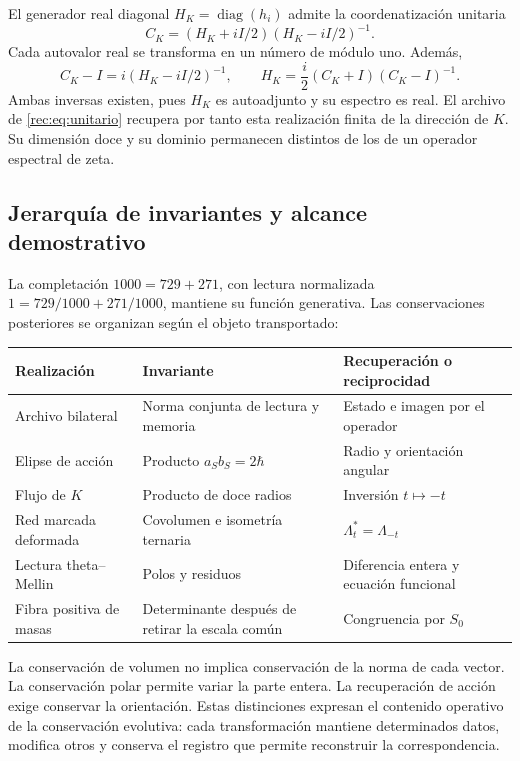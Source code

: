 El generador real diagonal \(H_K=\operatorname{diag}(h_i)\) admite la coordenatización unitaria
\[
 C_K=(H_K+iI/2)(H_K-iI/2)^{-1}.
\]
Cada autovalor real se transforma en un número de módulo uno. Además,
\[
 C_K-I=i(H_K-iI/2)^{-1},\qquad
 H_K=\frac i2(C_K+I)(C_K-I)^{-1}.
\]
Ambas inversas existen, pues \(H_K\) es autoadjunto y su espectro es real. El archivo de \eqref{rec:eq:unitario} recupera por tanto esta realización finita de la dirección de \(K\). Su dimensión doce y su dominio permanecen distintos de los de un operador espectral de zeta.

\subsection{Jerarquía de invariantes y alcance demostrativo}

La completación \(1000=729+271\), con lectura normalizada \(1=729/1000+271/1000\), mantiene su función generativa. Las conservaciones posteriores se organizan según el objeto transportado:
\begin{center}
\small
\begin{tabularx}{\linewidth}{@{}p{.27\linewidth}Xp{.25\linewidth}@{}}
\toprule
Realización & Invariante & Recuperación o reciprocidad\\
\midrule
Archivo bilateral & Norma conjunta de lectura y memoria & Estado e imagen por el operador\\
Elipse de acción & Producto \(a_Sb_S=2\hbar\) & Radio y orientación angular\\
Flujo de \(K\) & Producto de doce radios & Inversión \(t\mapsto-t\)\\
Red marcada deformada & Covolumen e isometría ternaria & \(\Lambda_t^*=\Lambda_{-t}\)\\
Lectura theta--Mellin & Polos y residuos & Diferencia entera y ecuación funcional\\
Fibra positiva de masas & Determinante después de retirar la escala común & Congruencia por \(S_0\)\\
\bottomrule
\end{tabularx}
\end{center}

La conservación de volumen no implica conservación de la norma de cada vector. La conservación polar permite variar la parte entera. La recuperación de acción exige conservar la orientación. Estas distinciones expresan el contenido operativo de la conservación evolutiva: cada transformación mantiene determinados datos, modifica otros y conserva el registro que permite reconstruir la correspondencia.

